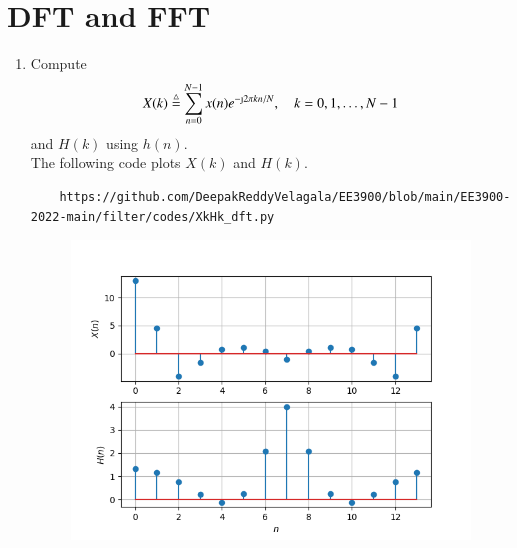 \documentclass[journal,12pt,twocolumn]{IEEEtran}
\renewcommand\thesection{\arabic{section}}
\begin{document}
%
\section{DFT and FFT}
\begin{enumerate}[label=\thesection.\arabic*]
\item
Compute
\begin{equation}
X(k) \define \sum _{n=0}^{N-1}x(n) e^{-\text{\j}2\pi kn/N}, \quad k = 0,1,\dots, N-1
\end{equation}
and $H(k)$ using $h(n)$. \\
\solution The following code plots $X(k)$ and $H(k)$.
\begin{lstlisting}
    https://github.com/DeepakReddyVelagala/EE3900/blob/main/EE3900-2022-main/filter/codes/XkHk_dft.py
\end{lstlisting}
\begin{figure}[!ht]
\centering
\includegraphics[width=\columnwidth]{figs/Xk_Hk.png}
\caption{}
\label{fig:Hk_Xk}
\end{figure}


\end{enumerate}
\end{document}
